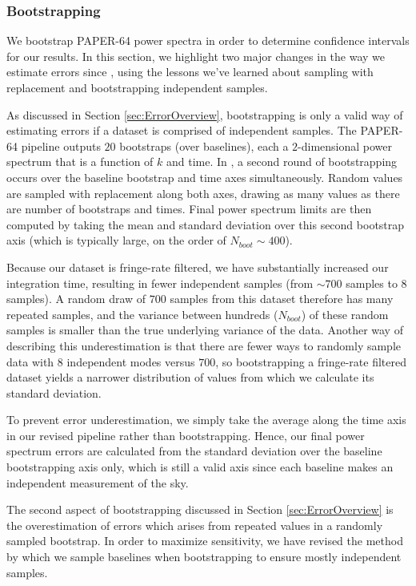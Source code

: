 \documentclass[preprint2,numberedappendix,tighten]{aastex6}  %
\begin{document}
\subsubsection{Bootstrapping}
\label{sec:Boot}

We bootstrap PAPER-64 power spectra in order to determine confidence intervals for our results. In this section, we highlight two major changes in the way we estimate errors since \citet{ali_et_al2015}, using the lessons we've learned about sampling with replacement and bootstrapping independent samples.

As discussed in Section \ref{sec:ErrorOverview}, bootstrapping is only a valid way of estimating errors if a dataset is comprised of independent samples. The PAPER-64 pipeline outputs $20$ bootstraps (over baselines), each a $2$-dimensional power spectrum that is a function of $k$ and time. In \citet{ali_et_al2015}, a second round of bootstrapping occurs over the baseline bootstrap and time axes simultaneously. Random values are sampled with replacement along both axes, drawing as many values as there are number of bootstraps and times. Final power spectrum limits are then computed by taking the mean and standard deviation over this second bootstrap axis (which is typically large, on the order of $N_{boot} \sim 400$). 

Because our dataset is fringe-rate filtered, we have substantially increased our integration time, resulting in fewer independent samples (from $\sim700$ samples to $8$ samples). A random draw of $700$ samples from this dataset therefore has many repeated samples, and the variance between hundreds ($N_{boot}$) of these random samples is smaller than the true underlying variance of the data. Another way of describing this underestimation is that there are fewer ways to randomly sample data with $8$ independent modes versus $700$, so bootstrapping a fringe-rate filtered dataset yields a narrower distribution of values from which we calculate its standard deviation.

To prevent error underestimation, we simply take the average along the time axis in our revised pipeline rather than bootstrapping. Hence, our final power spectrum errors are calculated from the standard deviation over the baseline bootstrapping axis only, which is still a valid axis since each baseline makes an independent measurement of the sky.

The second aspect of bootstrapping discussed in Section \ref{sec:ErrorOverview} is the overestimation of errors which arises from repeated values in a randomly sampled bootstrap. In order to maximize sensitivity, we have revised the method by which we sample baselines when bootstrapping to ensure mostly independent samples.
\end{document}
